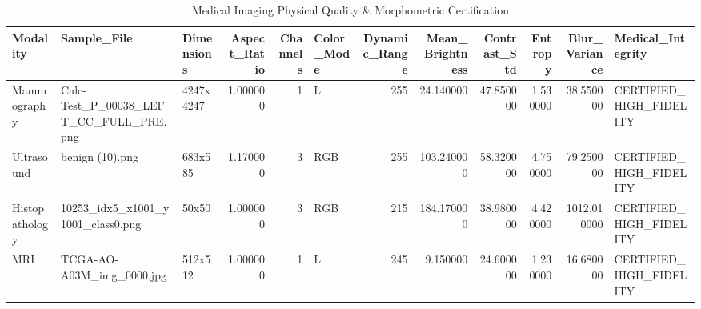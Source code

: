 \begin{table}
\caption{Medical Imaging Physical Quality & Morphometric Certification}
\label{tab:table_image_quality}
\begin{tabular}{lllrrlrrrrrl}
\toprule
Modality & Sample\_File & Dimensions & Aspect\_Ratio & Channels & Color\_Mode & Dynamic\_Range & Mean\_Brightness & Contrast\_Std & Entropy & Blur\_Variance & Medical\_Integrity \\
\midrule
Mammography & Calc-Test\_P\_00038\_LEFT\_CC\_FULL\_PRE.png & 4247x4247 & 1.000000 & 1 & L & 255 & 24.140000 & 47.850000 & 1.530000 & 38.550000 & CERTIFIED\_HIGH\_FIDELITY \\
Ultrasound & benign (10).png & 683x585 & 1.170000 & 3 & RGB & 255 & 103.240000 & 58.320000 & 4.750000 & 79.250000 & CERTIFIED\_HIGH\_FIDELITY \\
Histopathology & 10253\_idx5\_x1001\_y1001\_class0.png & 50x50 & 1.000000 & 3 & RGB & 215 & 184.170000 & 38.980000 & 4.420000 & 1012.010000 & CERTIFIED\_HIGH\_FIDELITY \\
MRI & TCGA-AO-A03M\_img\_0000.jpg & 512x512 & 1.000000 & 1 & L & 245 & 9.150000 & 24.600000 & 1.230000 & 16.680000 & CERTIFIED\_HIGH\_FIDELITY \\
\bottomrule
\end{tabular}
\end{table}
